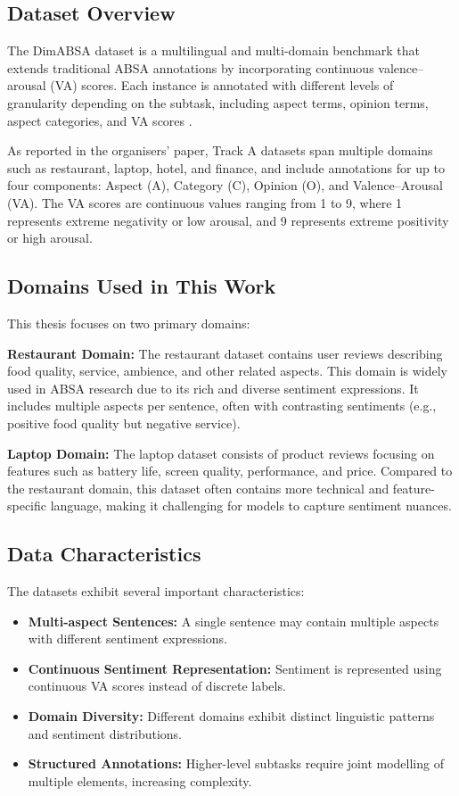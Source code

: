 \documentclass{article}
\begin{document}
\subsection{Dataset Overview}

The DimABSA dataset is a multilingual and multi-domain benchmark that extends traditional ABSA annotations by incorporating continuous valence–arousal (VA) scores. Each instance is annotated with different levels of granularity depending on the subtask, including aspect terms, opinion terms, aspect categories, and VA scores \cite{lee2026dimabsabuildingmultilingualmultidomain}.

As reported in the organisers' paper, Track A datasets span multiple domains such as restaurant, laptop, hotel, and finance, and include annotations for up to four components: Aspect (A), Category (C), Opinion (O), and Valence–Arousal (VA). The VA scores are continuous values ranging from 1 to 9, where 1 represents extreme negativity or low arousal, and 9 represents extreme positivity or high arousal.

\subsection{Domains Used in This Work}

This thesis focuses on two primary domains:

\textbf{Restaurant Domain:}  
The restaurant dataset contains user reviews describing food quality, service, ambience, and other related aspects. This domain is widely used in ABSA research due to its rich and diverse sentiment expressions. It includes multiple aspects per sentence, often with contrasting sentiments (e.g., positive food quality but negative service).

\textbf{Laptop Domain:}  
The laptop dataset consists of product reviews focusing on features such as battery life, screen quality, performance, and price. Compared to the restaurant domain, this dataset often contains more technical and feature-specific language, making it challenging for models to capture sentiment nuances.

\subsection{Data Characteristics}

The datasets exhibit several important characteristics:

\begin{itemize}
    \item \textbf{Multi-aspect Sentences:} A single sentence may contain multiple aspects with different sentiment expressions.
    \item \textbf{Continuous Sentiment Representation:} Sentiment is represented using continuous VA scores instead of discrete labels.
    \item \textbf{Domain Diversity:} Different domains exhibit distinct linguistic patterns and sentiment distributions.
    \item \textbf{Structured Annotations:} Higher-level subtasks require joint modelling of multiple elements, increasing complexity.
\end{itemize}
\end{document}
